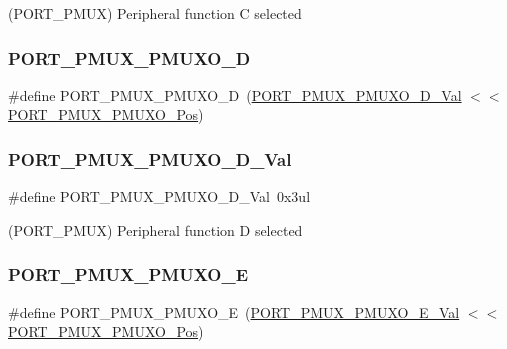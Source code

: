 (P\+O\+R\+T\+\_\+\+P\+M\+UX) Peripheral function C selected 

\mbox{\label{group___s_a_m_d21___p_o_r_t_ga27b8f2350fefc4aa13a4875b02a1c8e6}} 
\subsubsection{\texorpdfstring{PORT\_PMUX\_PMUXO\_D}{PORT\_PMUX\_PMUXO\_D}}
{\footnotesize\ttfamily \#define P\+O\+R\+T\+\_\+\+P\+M\+U\+X\+\_\+\+P\+M\+U\+X\+O\+\_\+D~(\mbox{\hyperlink{group___s_a_m_d21___p_o_r_t_gaf734acd7133d2ca63b25d22ac88b8c82}{P\+O\+R\+T\+\_\+\+P\+M\+U\+X\+\_\+\+P\+M\+U\+X\+O\+\_\+\+D\+\_\+\+Val}}         $<$$<$ \mbox{\hyperlink{group___s_a_m_d21___p_o_r_t_ga80a28619ad2db553b64d4ce4545368d3}{P\+O\+R\+T\+\_\+\+P\+M\+U\+X\+\_\+\+P\+M\+U\+X\+O\+\_\+\+Pos}})}

\mbox{\label{group___s_a_m_d21___p_o_r_t_gaf734acd7133d2ca63b25d22ac88b8c82}} 
\subsubsection{\texorpdfstring{PORT\_PMUX\_PMUXO\_D\_Val}{PORT\_PMUX\_PMUXO\_D\_Val}}
{\footnotesize\ttfamily \#define P\+O\+R\+T\+\_\+\+P\+M\+U\+X\+\_\+\+P\+M\+U\+X\+O\+\_\+\+D\+\_\+\+Val~0x3ul}



(P\+O\+R\+T\+\_\+\+P\+M\+UX) Peripheral function D selected 

\mbox{\label{group___s_a_m_d21___p_o_r_t_ga866ded214067f1df089a87754ec520a6}} 
\subsubsection{\texorpdfstring{PORT\_PMUX\_PMUXO\_E}{PORT\_PMUX\_PMUXO\_E}}
{\footnotesize\ttfamily \#define P\+O\+R\+T\+\_\+\+P\+M\+U\+X\+\_\+\+P\+M\+U\+X\+O\+\_\+E~(\mbox{\hyperlink{group___s_a_m_d21___p_o_r_t_ga45edb06df6af2d9ff6db7b1945080670}{P\+O\+R\+T\+\_\+\+P\+M\+U\+X\+\_\+\+P\+M\+U\+X\+O\+\_\+\+E\+\_\+\+Val}}         $<$$<$ \mbox{\hyperlink{group___s_a_m_d21___p_o_r_t_ga80a28619ad2db553b64d4ce4545368d3}{P\+O\+R\+T\+\_\+\+P\+M\+U\+X\+\_\+\+P\+M\+U\+X\+O\+\_\+\+Pos}})}

